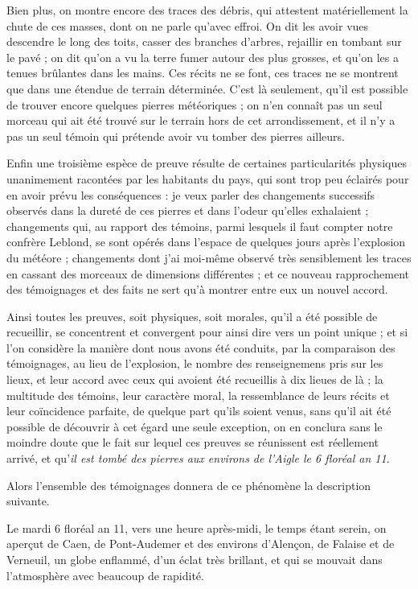 \documentclass[a4paper, 11pt, oneside, polutonikogreek, french]{article}
\begin{document}
Bien plus, on montre encore des traces des débris, qui attestent matériellement la chute de ces masses, dont on ne parle qu'avec effroi. On dit les avoir vues descendre le long des toits, casser des branches d'arbres, rejaillir en tombant sur le pavé ; on dit qu'on a vu la terre fumer autour des plus grosses, et qu'on les a tenues brûlantes dans les mains. Ces récits ne se font, ces traces ne se montrent que dans une étendue de terrain déterminée. C'est là seulement, qu'il est possible de trouver encore quelques pierres météoriques ; on n'en connaît pas un seul morceau qui ait été trouvé sur le terrain hors de cet arrondissement, et il n'y a pas un seul témoin qui prétende avoir vu tomber des pierres ailleurs.

Enfin une troisième espèce de preuve résulte de certaines particularités physiques unanimement racontées par les habitants du pays, qui sont trop peu éclairés pour en avoir prévu les conséquences : je veux parler des changements successifs observés dans la dureté de ces pierres et dans l'odeur qu'elles exhalaient ; changements qui, au rapport des témoins, parmi lesquels il faut compter notre confrère Leblond, se sont opérés dans l'espace de quelques jours après l'explosion du météore ; changements dont j'ai moi-même observé très sensiblement les traces en cassant des morceaux de dimensions différentes ; et ce nouveau rapprochement des témoignages et des faits ne sert qu'à montrer entre eux un nouvel accord.

Ainsi toutes les preuves, soit physiques, soit morales, qu'il a été possible de recueillir, se concentrent et convergent pour ainsi dire vers un point unique ; et si l'on considère la manière dont nous avons été conduits, par la comparaison des témoignages, au lieu de l'explosion, le nombre des renseignemens pris sur les lieux, et leur accord avec ceux qui avoient été recueillis à dix lieues de là ; la multitude des témoins, leur caractère moral, la ressemblance de leurs récits et leur coïncidence parfaite, de quelque part qu'ils soient venus, sans qu'il ait été possible de découvrir à cet égard une seule exception, on en conclura sans le moindre doute que le fait sur lequel ces preuves se réunissent est réellement arrivé, et qu'\emph{il est tombé des pierres aux environs de l'Aigle le 6 floréal an 11.}

Alors l'ensemble des témoignages donnera de ce phénomène la description suivante.

Le mardi 6 floréal an 11, vers une heure après-midi, le temps étant serein, on aperçut de Caen, de Pont-Audemer et des environs d'Alençon, de Falaise et de Verneuil, un globe enflammé, d'un éclat très brillant, et qui se mouvait dans l'atmosphère avec beaucoup de rapidité. 
\end{document}
